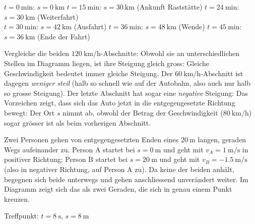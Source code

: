 \begin{beispielbox}
\begin{center}
\footnotesize $t=\SI{0}{\minute}$: $s=\SI{0}{\kilo\meter}$ \quad
$t=\SI{15}{\minute}$: $s=\SI{30}{\kilo\meter}$ (Ankunft Raststätte) \quad
$t=\SI{24}{\minute}$: $s=\SI{30}{\kilo\meter}$ (Weiterfahrt)\\
$t=\SI{30}{\minute}$: $s=\SI{42}{\kilo\meter}$ (Ausfahrt) \quad
$t=\SI{36}{\minute}$: $s=\SI{48}{\kilo\meter}$ (Wende) \quad
$t=\SI{45}{\minute}$: $s=\SI{36}{\kilo\meter}$ (Ende der Fahrt)
\end{center}

Vergleiche die beiden $\SI{120}{\kilo\meter\per\hour}$-Abschnitte: Obwohl
sie an unterschiedlichen Stellen im Diagramm liegen, ist ihre Steigung
gleich gross: Gleiche Geschwindigkeit bedeutet immer gleiche Steigung.
Der $\SI{60}{\kilo\meter\per\hour}$-Abschnitt ist dagegen \emph{weniger
steil} (halb so schnell wie auf der Autobahn, also auch nur halb so grosse
Steigung). Der letzte Abschnitt hat sogar eine \emph{negative} Steigung:
Das Vorzeichen zeigt, dass sich das Auto jetzt in die entgegengesetzte
Richtung bewegt: Der Ort $s$ nimmt ab, obwohl der Betrag der
Geschwindigkeit ($\SI{80}{\kilo\meter\per\hour}$) sogar grösser ist als
beim vorherigen Abschnitt.
\end{beispielbox}

\begin{beispielbox}
Zwei Personen gehen von entgegengesetzten Enden eines $\SI{20}{\meter}$
langen, geraden Wegs aufeinander zu. Person A startet bei
$s=\SI{0}{\meter}$ und geht mit $v_A=\SI{1}{\meter\per\second}$ in
positiver Richtung; Person B startet bei $s=\SI{20}{\meter}$ und geht mit
$v_B=\SI{-1.5}{\meter\per\second}$ (also in negativer Richtung, auf Person
A zu). Da keine der beiden anhält, begegnen sich beide unterwegs und gehen
anschliessend unverändert weiter. Im Diagramm zeigt sich das als zwei
Geraden, die sich in genau einem Punkt kreuzen.

\begin{center}

\footnotesize Treffpunkt: $t=\SI{8}{\second}$, $s=\SI{8}{\meter}$
\end{center}
\end{beispielbox}

